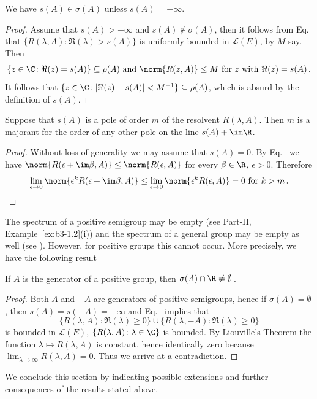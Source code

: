 \begin{corollary}\label{cor:c3-1.4}
We have $s(A) \in \sigma(A)$ unless $s(A) = -\infty$.
\end{corollary}
\begin{proof}
Assume that $s(A) > -\infty$ and $s(A) \notin \sigma(A)$, then it follows from Eq.~ that $\{R(\lambda,A) \colon \Re(\lambda) > s(A)\}$ is uniformly bounded in $\mathcal{L}(E)$, by $M$ say. 
Then
\[
\{z \in \C  \colon \Re(z) = s(A)\} \subseteq \rho(A) \text{ and } 
\norm{R(z,A)} \leq M \text{ for } z  \text{ with } \Re(z) = s(A)\,.
\]
It follows that $\{z \in \C  \colon |\Re(z) - s(A)| < M^{-1}\} \subseteq \rho(A)$, which is absurd by the definition of\/ $s(A)$.
\end{proof}

\begin{corollary}\label{cor:c3-1.5}
Suppose that $s(A)$ is a pole%
of order $m$ of the resolvent $R(\lambda,A)$.
Then $m$ is a majorant for the order of any other pole on the line $s(A) + \im\R $.
\end{corollary}
\begin{proof}
Without loss of generality we may assume that $s(A) = 0$.
By Eq.~ we have $\norm{R(\epsilon+\im\beta ,A)} \leq \norm{R(\epsilon,A)}$ for every $\beta \in \R $, $\epsilon > 0$.
Therefore 
\[
\lim_{\epsilon\to 0}\norm{\epsilon^k R(\epsilon+\im\beta ,A)} \leq \lim_{\epsilon\to 0}\norm{\epsilon^k R(\epsilon,A)} = 0 \text{ for } k > m\,.
\]
\end{proof}
The spectrum of a positive semigroup may be empty (see Part-II, Example~\ref{ex:b3-1.2}(i)) and the spectrum of a general group may be empty as well (see \textcite[Section~23.16]{hillephillips:1957}).
However, for positive groups this cannot occur.
More precisely, we have the following result
\begin{corollary}\label{cor:c3-1.6}
If\/ $A$ is the generator of a positive group, then $\sigma(A)\cap\R  \neq \emptyset$\,.
\end{corollary}
\begin{proof}
Both $A$ and $-A$ are generators of positive semigroups, hence if\/ $\sigma(A) = \emptyset$, then $s(A) = s(-A) = -\infty$ and Eq.~ implies that 
\[
\{R(\lambda,A) \colon \Re(\lambda) \geq 0\} \cup \{R(\lambda,-A) \colon \Re(\lambda) \geq 0\}
\]
is bounded in $\mathcal{L}(E)$, \ie  $\{R(\lambda,A) \colon \lambda \in \C \}$ is bounded.
By Liouville's Theorem the function $\lambda \mapsto R(\lambda,A)$ is constant, hence identically zero because $\displaystyle \lim_{\lambda\to\infty}R(\lambda,A) = 0$.
Thus we arrive at a contradiction.
\end{proof}
We conclude this section by indicating possible extensions and further consequences of the results stated above.

